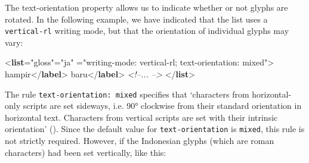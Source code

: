 The text-orientation property allows us to indicate whether or not glyphs are rotated. In the following example, we have indicated that the list uses a \texttt{vertical-rl} writing mode, but that the orientation of individual glyphs may vary:\par\bgroup{}\exampleFont \begin{shaded}\noindent\mbox{}{<\textbf{list}\hspace*{1em}{type}="{gloss}"\hspace*{1em}{xml:lang}="{ja}"\mbox{}\newline 
\hspace*{1em}{style}="{writing-mode: vertical-rl; text-orientation: mixed}">}\mbox{}\newline 
{}hampir{</\textbf{label}>}\mbox{}\newline 
{}\mbox{}\newline 
{}baru{</\textbf{label}>}\mbox{}\newline 
{}\mbox{}\newline 
\textit{<!--{\textJapanese  ... }-->}\mbox{}\newline 
{</\textbf{list}>}\end{shaded}\egroup\par \par
The rule \texttt{text-orientation: mixed} specifies that ‘characters from horizontal-only scripts are set sideways, i.e. 90° clockwise from their standard orientation in horizontal text. Characters from vertical scripts are set with their intrinsic orientation’ (). Since the default value for \texttt{text-orientation} is \texttt{mixed}, this rule is not strictly required. However, if the Indonesian glyphs (which are roman characters) had been set vertically, like this:\par
